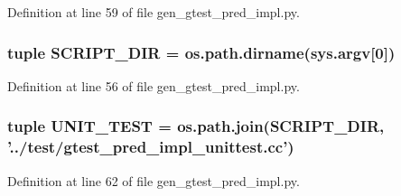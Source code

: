 \-Definition at line 59 of file gen\-\_\-gtest\-\_\-pred\-\_\-impl.\-py.

\hypertarget{namespacegen__gtest__pred__impl_a4d93d2dae90998f96a05fb95f8b395ef}{
\subsubsection[{\-S\-C\-R\-I\-P\-T\-\_\-\-D\-I\-R}]{\setlength{\rightskip}{0pt plus 5cm}tuple {\bf \-S\-C\-R\-I\-P\-T\-\_\-\-D\-I\-R} = os.\-path.\-dirname(sys.\-argv\mbox{[}0\mbox{]})}}\label{d0/db7/namespacegen__gtest__pred__impl_a4d93d2dae90998f96a05fb95f8b395ef}


\-Definition at line 56 of file gen\-\_\-gtest\-\_\-pred\-\_\-impl.\-py.

\hypertarget{namespacegen__gtest__pred__impl_acab6433f6bcd5170abb94fded3418201}{
\subsubsection[{\-U\-N\-I\-T\-\_\-\-T\-E\-S\-T}]{\setlength{\rightskip}{0pt plus 5cm}tuple {\bf \-U\-N\-I\-T\-\_\-\-T\-E\-S\-T} = os.\-path.\-join({\bf \-S\-C\-R\-I\-P\-T\-\_\-\-D\-I\-R}, '../test/gtest\-\_\-pred\-\_\-impl\-\_\-unittest.\-cc')}}\label{d0/db7/namespacegen__gtest__pred__impl_acab6433f6bcd5170abb94fded3418201}


\-Definition at line 62 of file gen\-\_\-gtest\-\_\-pred\-\_\-impl.\-py.

